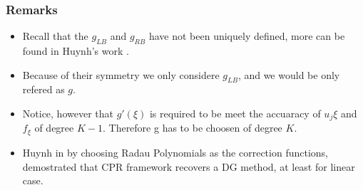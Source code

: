 \begin{frame} \frametitle{Remarks}
	\begin{itemize}
	\item Recall that the $g_{LB}$ and $g_{RB}$ have not been uniquely defined, more can be found in Huynh's work \cite{Huynh2007}.
	\item Because of their symmetry we only considere $g_{LB}$, and we would be only refered as $g$. 
	\item Notice, however that $g'(\xi)$ is required to be meet the accuaracy of $u_j{\xi}$ and $f_{\xi}$ of degree $K-1$. Therefore g has to be choosen of degree $K$.  
	\item Huynh in \cite{Huynh2007} by choosing Radau Polynomials as the correction functions, demostrated that CPR framework recovers a DG method, at least for linear case.
	\end{itemize}
\end{frame}
